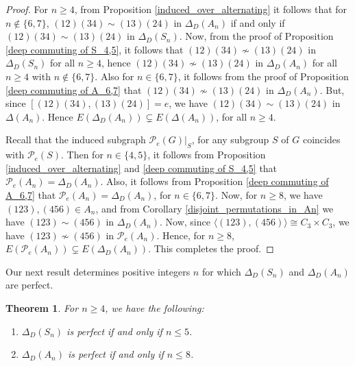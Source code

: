 \documentclass[12pt,a4paper]{article}
\newtheorem{theorem}{Theorem}[section]
\begin{document}
\begin{proof}
For $n\geq 4$, from Proposition \ref{induced_over_alternating} it follows that for $n\notin \{6,7\}$, $(12)(34)\sim (13)(24)$ in $\Delta_D(A_n)$ if and only if $(12)(34)\sim (13)(24)$ in $\Delta_D(S_n)$. Now, from the proof of Proposition \ref{deep commuting of S_4,5}, it follows that $(12)(34)\nsim (13)(24)$ in $\Delta_D(S_n)$ for all $n\geq 4$, hence $(12)(34)\nsim (13)(24)$ in $\Delta_D(A_n)$ for all $n\geq 4$ with $n\notin \{6,7\}$. Also for $n\in\{6,7\}$, it follows from the proof of Proposition \ref{deep commuting of A_6,7} that $(12)(34)\nsim (13)(24)$ in $\Delta_D(A_n)$. But, since $[(12)(34),(13)(24)]=e$, we have $(12)(34)\sim (13)(24)$ in $\Delta(A_n)$. Hence $E(\Delta_D(A_n))\subsetneq E(\Delta(A_n))$, for all $n\geq 4$.   

Recall that the induced subgraph $\mathcal{P}_e(G)\vert_S$, for any subgroup $S$ of $G$ coincides with $\mathcal{P}_e(S)$. Then for $n\in\{4,5\}$, it follows from Proposition \ref{induced_over_alternating} and \ref{deep commuting of S_4,5} that $\mathcal{P}_e(A_n)=\Delta_D(A_n)$. Also, it follows from Proposition \ref{deep commuting of A_6,7} that $\mathcal{P}_e(A_n)=\Delta_D(A_n)$, for $n\in\{6,7\}$. Now, for $n\geq 8$, we have $(123),(456)\in A_n$, and from Corollary \ref{disjoint_permutations_in_An} we have $(123)\sim(456)$ in $\Delta_D(A_n)$. Now, since $\langle(123),(456)\rangle\cong C_3\times C_3$, we have $(123)\nsim(456)$ in $\mathcal{P}_e(A_n)$. Hence, for $n\geq 8$, $E(\mathcal{P}_e(A_n))\subsetneq E(\Delta_D(A_n))$. This completes the proof.  
\end{proof}
Our next result determines positive integers $n$ for which $\Delta_D(S_n)$ and $\Delta_D(A_n)$ are perfect.
\begin{theorem}\label{permutation_perfect}
For $n\geq 4$, we have the following:
\begin{enumerate}[\rm (i)]
    \item $\Delta_D(S_n)$ is perfect if and only if $n\leq 5$.
    \item $\Delta_D(A_n)$ is perfect if and only if $n\leq 8$.
\end{enumerate}
\end{theorem}
\end{document}

